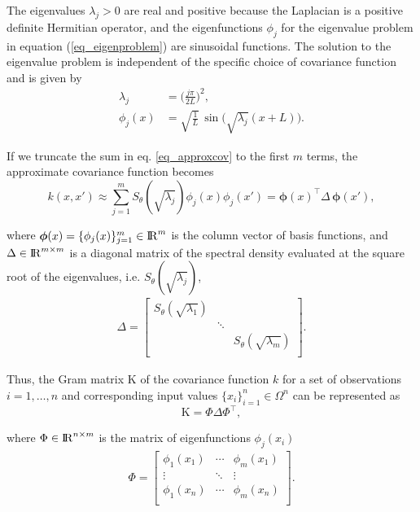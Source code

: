 \documentclass[onecolumn,a4paper,11pt]{article}
\begin{document}
\noindent The eigenvalues $\lambda_j>0$ are real and positive because the Laplacian is a positive definite Hermitian operator, and the eigenfunctions $\phi_j$ for the eigenvalue problem in equation (\ref{eq_eigenproblem}) are sinusoidal functions. The solution to the eigenvalue problem is independent of  the specific choice of covariance function and is given by
%
\begin{align}
\lambda_j&=\Big(\frac{j\pi}{2L}\Big)^{\!2}, \label{eq_eigenvalue}\\
\phi_j(x)&=\sqrt{\frac{1}{L}}\, \sin\!\!\big(\sqrt{\lambda_j}(x+L)\big). \label{eq_eigenfunction}
\end{align}

If we truncate the sum in eq. \eqref{eq_approxcov} to the first $m$ terms, the approximate covariance function becomes
%
\begin{equation}
k(x,x') \approx \sum_{j=1}^m S_{\theta}(\sqrt{\lambda_j}) \phi_j(x) \phi_j(x') = \bm{\phi}(x)^\intercal \Delta \, \bm{\phi}(x'), \nonumber
\end{equation}

\noindent where $\bm{\phi}(x)=\{\phi_j(x)\}_{j=1}^{m} \in {\rm I\!R}^{m}$ is the column vector of basis functions, and $\Delta  \in {\rm I\!R}^{m\times m}$ is a diagonal matrix of the spectral density evaluated at the square root of the eigenvalues, i.e. $S_{\theta}(\sqrt{\lambda_j})$,
%
\begin{align}
\Delta =  \begin{bmatrix}
    S_{\theta}(\sqrt{\lambda_1}) & & \\
    & \ddots & \nonumber \\
    & & S_{\theta}(\sqrt{\lambda_m}) \\
  \end{bmatrix}.
\end{align}

Thus, the Gram matrix $\text{K}$ of the covariance function $k$ for a set of observations $i=1,\ldots,n$ and corresponding input values $\{x_i\}_{i=1}^{n} \in \Omega^{n}$ can be represented as
%
\begin{equation}
\text{K}= \Phi \Delta \Phi^\intercal, \nonumber
\end{equation}

\noindent where $\Phi \in {\rm I\!R}^{n\times m}$ is the matrix of eigenfunctions $\phi_j(x_i)$
%
\begin{align}
\Phi =  \left[ {\begin{array}{ccc}
   \phi_1(x_1) & \cdots & \phi_m(x_1)  \\
    \vdots &\ddots & \vdots  \nonumber \\ 
    \phi_1(x_n) & \cdots & \phi_m(x_n) \\
  \end{array} } \right].
\end{align}
 
\end{document}
